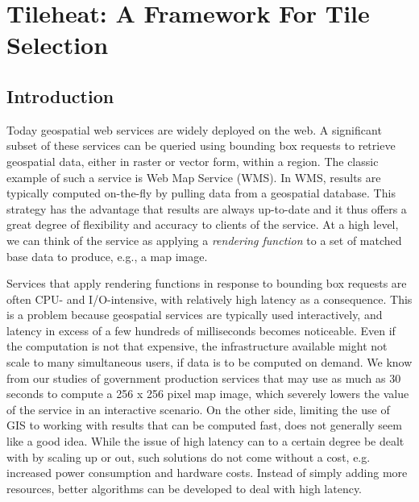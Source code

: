 \documentclass[11pt, oneside]{report}
\begin{document}



\chapter{Tileheat: A Framework For Tile Selection}
\label{chapter:tileheat}
\section{Introduction}

Today geospatial web services are widely deployed on the web. A significant subset of these services can be queried using bounding box requests to retrieve geospatial data, either in raster or vector form, within a region. The classic example of such a service is Web Map Service (WMS). In WMS, results are typically computed on-the-fly by pulling data from a geospatial database. This strategy has the advantage that results are always up-to-date and it thus offers a great degree of flexibility and accuracy to clients of the service. At a high level, we can think of the service as applying a \emph{rendering function} to a set of matched base data to produce, e.g., a map image.

Services that apply rendering functions in response to bounding box requests are often CPU- and I/O-intensive, with relatively high latency as a consequence. This is a problem because geospatial services are typically used interactively, and latency in excess of a few hundreds of milliseconds becomes noticeable. Even if the computation is not that expensive, the infrastructure available might not scale to many simultaneous users, if data is to be computed on demand. We know from our studies of government production services that may use as much as 30 seconds to compute a 256 x 256 pixel map image, which severely lowers the value of the service in an interactive scenario. On the other side, limiting the use of GIS to working with results that can be computed fast, does not generally seem like a good idea. While the issue of high latency can to a certain degree be dealt with by scaling up or out, such solutions do not come without a cost, e.g. increased power consumption and hardware costs. Instead of simply adding more resources, better algorithms can be developed to deal with high latency.
\end{document}
